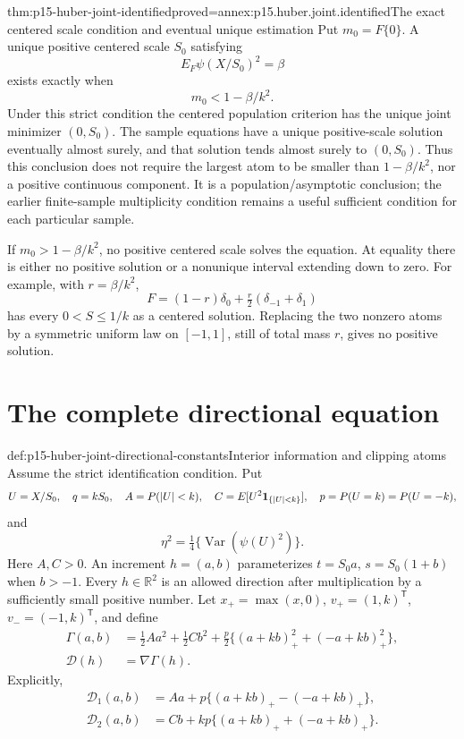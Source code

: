 \begin{hbtheorem}{thm:p15-huber-joint-identified}{proved=annex:p15.huber.joint.identified}{The exact centered scale condition and eventual unique estimation}
Put \(m_0=F\{0\}\). A unique positive centered scale \(S_0\) satisfying
\[
                    E_F\psi(X/S_0)^2=\beta
\]
exists exactly when
\[
                         m_0<1-\beta/k^2.
\]
Under this strict condition the centered population criterion
has the unique joint minimizer \((0,S_0)\).
The sample equations have a unique positive-scale solution eventually
almost surely, and that solution tends almost surely to \((0,S_0)\).
Thus this conclusion does not require the largest atom to be
smaller than \(1-\beta/k^2\), nor a positive continuous component.
It is a population/asymptotic conclusion; the earlier finite-sample
multiplicity condition remains a useful sufficient condition
for each particular sample.

If \(m_0>1-\beta/k^2\), no positive centered scale solves the equation.
At equality there is either no positive solution or a nonunique
interval extending down to zero. For example, with
\(r=\beta/k^2\),
\[
 F=(1-r)\delta_0+\tfrac r2(\delta_{-1}+\delta_1)
\]
has every \(0<S\leq1/k\) as a centered solution.
Replacing the two nonzero atoms by a symmetric uniform law on
\([-1,1]\), still of total mass \(r\), gives no positive solution.
\end{hbtheorem}

\section{The complete directional equation}
\label{sec:p15-huber-joint-directional}

\begin{hbdefinition}{def:p15-huber-joint-directional-constants}{Interior information and clipping atoms}
Assume the strict identification condition. Put
\[
 U=X/S_0,\quad q=kS_0,\quad
 A=P(|U|<k),\quad C=E[U^2{\bf1}_{\{|U|<k\}}],
 \quad p=P(U=k)=P(U=-k),
\]
and
\[
 \eta^2=\tfrac14\{\operatorname{Var}(\psi(U)^2)\}.
\]
Here \(A,C>0\). An increment \(h=(a,b)\) parameterizes
\(t=S_0a\), \(s=S_0(1+b)\) when \(b>-1\).
Every \(h\in\mathbb R^2\) is an allowed direction after multiplication
by a sufficiently small positive number.
Let \(x_+=\max(x,0)\), \(v_+=(1,k)^{\mathsf T}\),
\(v_-=(-1,k)^{\mathsf T}\), and define
\[
 \begin{split}
 \Gamma(a,b)&=\tfrac12Aa^2+\tfrac12Cb^2+
       \tfrac p2\{(a+kb)_+^2+(-a+kb)_+^2\},\\
 \mathcal D(h)&=\nabla\Gamma(h).
 \end{split}
\]
Explicitly,
\[
 \begin{split}
 \mathcal D_1(a,b)&=Aa+
       p\{(a+kb)_+-(-a+kb)_+\},\\
 \mathcal D_2(a,b)&=Cb+
       kp\{(a+kb)_++(-a+kb)_+\}.
 \end{split}
\]
\end{hbdefinition}

